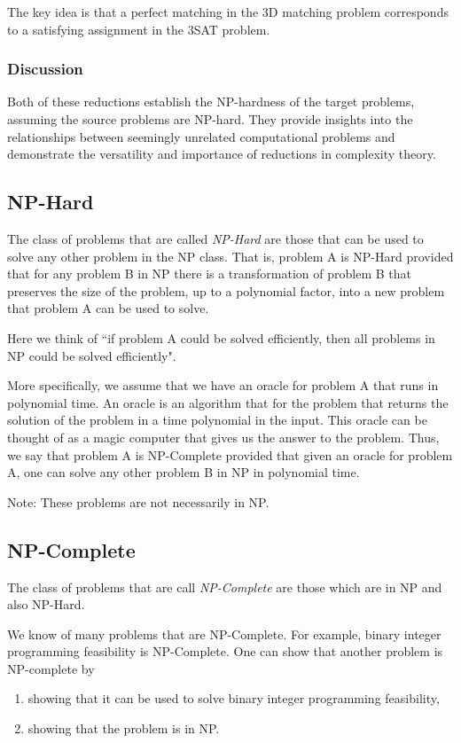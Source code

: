 The key idea is that a perfect matching in the 3D matching problem corresponds to a satisfying assignment in the 3SAT problem.

\subsubsection{Discussion}
Both of these reductions establish the NP-hardness of the target problems, assuming the source problems are NP-hard. They provide insights into the relationships between seemingly unrelated computational problems and demonstrate the versatility and importance of reductions in complexity theory.





\subsection{NP-Hard}
The class of problems that are called \emph{NP-Hard} are those that can be used to solve any other problem in the NP class.  
That is, problem A is NP-Hard provided that for any problem B in NP there is a transformation of problem B that preserves the size of the problem, up to a polynomial factor, into a new problem that problem A can be used to solve.

Here we think of ``if problem A could be solved efficiently, then all problems in NP could be solved efficiently".

More specifically, we assume that we have an oracle for problem A that runs in polynomial time.  An oracle is an algorithm that for the problem that returns the solution of the problem in a time polynomial in the input.   This oracle can be thought of as a magic computer that gives us the answer to the problem.   
Thus, we say that problem A is NP-Complete provided that given an oracle for problem A, one can solve any other problem B in NP in polynomial time.

Note:  These problems are not necessarily in NP.

\subsection{NP-Complete}
The class of problems that are call \emph{NP-Complete} are those which are in NP and also NP-Hard.  

We know of many problems that are NP-Complete.  For example, binary integer programming feasibility is NP-Complete.  One can show that another problem is NP-complete by 
\begin{enumerate}
\item showing that it can be used to solve binary integer programming feasibility,
\item showing that the problem is in NP.
\end{enumerate}

